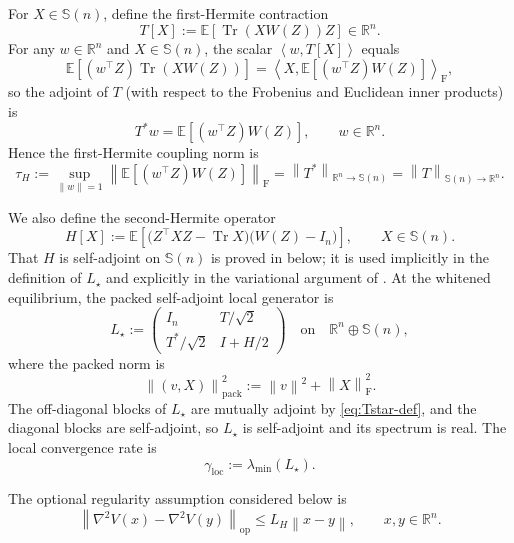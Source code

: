 \documentclass[11pt]{article}
\theoremstyle{plain}
\theoremstyle{definition}
\theoremstyle{remark}
\newcommand{\R}{\mathbb{R}}
\newcommand{\E}{\mathbb{E}}
\newcommand{\Sym}{\mathbb{S}}
\newcommand{\Tr}{\operatorname{Tr}}
\newcommand{\op}{\mathrm{op}}
\newcommand{\Id}{I}
\newcommand{\1}{\mathbf{1}}
\newcommand{\norm}[1]{\left\lVert #1\right\rVert}
\newcommand{\inner}[2]{\left\langle #1,#2\right\rangle}
\begin{document}
For $X\in\Sym(n)$, define the first-Hermite contraction
\begin{equation}
    T[X]
    :=
    \E\!\left[\Tr(XW(Z))Z\right]
    \in\R^n.
    \label{eq:T-def}
\end{equation}
For any $w\in\R^n$ and $X\in\Sym(n)$, the scalar $\inner{w}{T[X]}$ equals
\[
    \E[(w^\top Z)\Tr(XW(Z))]
    =\inner{X}{\E[(w^\top Z)W(Z)]}_{\mathrm F},
\]
so the adjoint of $T$ (with respect to the Frobenius and Euclidean inner
products) is
\begin{equation}
    T^*w
    =
    \E\!\left[(w^\top Z)W(Z)\right],
    \qquad w\in\R^n.
    \label{eq:Tstar-def}
\end{equation}
Hence the first-Hermite coupling norm is
\begin{equation}
    \tau_H
    :=
    \sup_{\norm{w}=1}
    \norm{\E[(w^\top Z)W(Z)]}_{\mathrm F}
    =
    \norm{T^*}_{\R^n\to\Sym(n)}
    =
    \norm{T}_{\Sym(n)\to\R^n}.
    \label{eq:tau-def}
\end{equation}

We also define the second-Hermite operator
\begin{equation}
    H[X]
    :=
    \E\!\left[
        \bigl(Z^\top XZ-\Tr X\bigr)\bigl(W(Z)-\Id_n\bigr)
    \right],
    \qquad X\in\Sym(n).
    \label{eq:H-def}
\end{equation}
That $H$ is self-adjoint on $\Sym(n)$ is proved in
 below; it is used implicitly in the definition of
$L_\star$ and explicitly in the variational argument of .
At the whitened equilibrium, the packed self-adjoint local generator is
\begin{equation}
    L_\star
    :=
    \begin{pmatrix}
        \Id_n & T/\sqrt2\\[2mm]
        T^*/\sqrt2 & \Id+H/2
    \end{pmatrix}
    \quad\text{on}\quad
    \R^n\oplus\Sym(n),
    \label{eq:Lstar-def}
\end{equation}
where the packed norm is
\[
    \norm{(v,X)}_{\mathrm{pack}}^2
    :=
    \norm v^2+\norm X_{\mathrm F}^2.
\]
The off-diagonal blocks of $L_\star$ are mutually adjoint by
\eqref{eq:Tstar-def}, and the diagonal blocks are self-adjoint, so $L_\star$
is self-adjoint and its spectrum is real. The local convergence rate is
\[
    \gamma_{\mathrm{loc}}
    :=
    \lambda_{\min}(L_\star).
\]

The optional regularity assumption considered below is
\begin{equation}
    \norm{\nabla^2V(x)-\nabla^2V(y)}_{\op}
    \leq
    L_H\norm{x-y},
    \qquad x,y\in\R^n.
    \label{eq:H3}
\end{equation}
\end{document}
